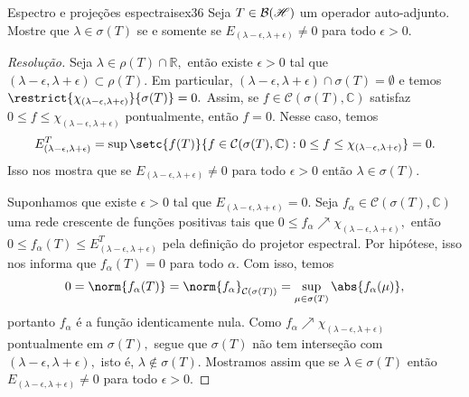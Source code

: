 \begin{exercício}{Espectro e projeções espectrais}{ex36}
  Seja \(T \in \mathcal{B}(\mathscr{H})\) um operador auto-adjunto. Mostre que \(\lambda \in \sigma(T)\) se e somente se \(E_{(\lambda - \epsilon, \lambda+\epsilon)} \neq 0\) para todo \(\epsilon > 0.\)
\end{exercício}
\begin{proof}[Resolução]
  Seja \(\lambda \in \rho(T) \cap \mathbb{R},\) então existe \(\epsilon > 0\) tal que \((\lambda - \epsilon, \lambda + \epsilon) \subset \rho(T).\) Em particular, \((\lambda - \epsilon, \lambda + \epsilon) \cap \sigma(T) = \emptyset\) e temos \(\restrict{\chi_{(\lambda - \epsilon, \lambda + \epsilon)}}{\sigma(T)} = 0.\) Assim, se \(f \in \mathcal{C}(\sigma(T), \mathbb{C})\) satisfaz \(0 \leq f \leq \chi_{(\lambda - \epsilon, \lambda + \epsilon)}\) pontualmente, então \(f = 0.\) Nesse caso, temos
  \begin{equation*}
    E_{(\lambda - \epsilon, \lambda + \epsilon)}^T = \sup\setc{f(T)}{f \in \mathcal{C}(\sigma(T), \mathbb{C}) : 0 \leq f \leq \chi_{(\lambda - \epsilon, \lambda + \epsilon)}} = 0.
  \end{equation*}
  Isso nos mostra que se \(E_{(\lambda - \epsilon, \lambda + \epsilon)} \neq 0\) para todo \(\epsilon > 0\) então \(\lambda \in \sigma(T).\)

  Suponhamos que existe \(\epsilon > 0\) tal que \(E_{(\lambda - \epsilon, \lambda + \epsilon)} = 0.\) Seja \(f_{\alpha} \in \mathcal{C}(\sigma(T), \mathbb{C})\) uma rede crescente de funções positivas tais que \(0 \leq f_{\alpha} \nearrow \chi_{(\lambda - \epsilon, \lambda + \epsilon)},\) então \(0 \leq f_\alpha(T) \leq E^T_{(\lambda - \epsilon, \lambda + \epsilon)}\) pela definição do projetor espectral. Por hipótese, isso nos informa que \(f_\alpha(T) = 0\) para todo \(\alpha.\) Com isso, temos
  \begin{equation*}
    0 = \norm{f_\alpha(T)} = \norm{f_\alpha}_{\mathcal{C}(\sigma(T))} = \sup_{\mu \in \sigma(T)}\abs{f_\alpha(\mu)},
  \end{equation*}
  portanto \(f_\alpha\) é a função identicamente nula. Como \(f_\alpha \nearrow \chi_{(\lambda - \epsilon, \lambda + \epsilon)}\) pontualmente em \(\sigma(T),\) segue que \(\sigma(T)\) não tem interseção com \((\lambda - \epsilon, \lambda + \epsilon),\) isto é, \(\lambda \notin \sigma(T).\) Mostramos assim que se \(\lambda \in \sigma(T)\) então \(E_{(\lambda - \epsilon, \lambda + \epsilon)} \neq 0\) para todo \(\epsilon > 0.\)
\end{proof}
